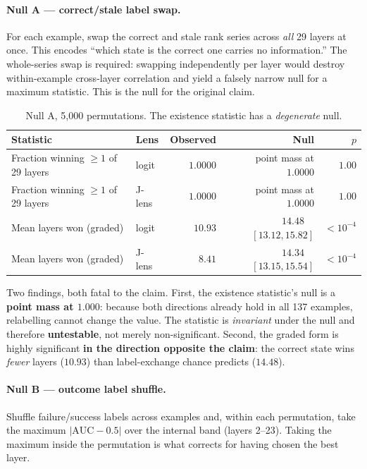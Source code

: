 \documentclass[11pt]{article}
\newcommand{\fail}[1]{\textcolor{bad}{\textbf{#1}}}
\begin{document}
\paragraph{Null A --- correct/stale label swap.} For each example, swap the correct and
stale rank series across \emph{all} 29 layers at once. This encodes ``which state is the
correct one carries no information.'' The whole-series swap is required: swapping
independently per layer would destroy within-example cross-layer correlation and yield a
falsely narrow null for a maximum statistic. This is the null for the original claim.

\begin{table}[h]
\centering\small
\begin{tabular}{llrrr}
\toprule
Statistic & Lens & Observed & Null & $p$ \\
\midrule
Fraction winning $\geq 1$ of 29 layers & logit & $1.0000$ & point mass at $1.0000$ & \fail{$1.00$} \\
Fraction winning $\geq 1$ of 29 layers & J-lens & $1.0000$ & point mass at $1.0000$ & \fail{$1.00$} \\
Mean layers won (graded)               & logit & $10.93$ & $14.48$\ \ $[13.12, 15.82]$ & \fail{$<10^{-4}$} \\
Mean layers won (graded)               & J-lens & $8.41$ & $14.34$\ \ $[13.15, 15.54]$ & \fail{$<10^{-4}$} \\
\bottomrule
\end{tabular}
\caption{Null A, 5{,}000 permutations. The existence statistic has a \emph{degenerate} null.}
\end{table}

Two findings, both fatal to the claim. First, the existence statistic's null is a
\textbf{point mass at $1.000$}: because both directions already hold in all 137 examples,
relabelling cannot change the value. The statistic is \emph{invariant} under the null and
therefore \textbf{untestable}, not merely non-significant. Second, the graded form is highly
significant \textbf{in the direction opposite the claim}: the correct state wins
\emph{fewer} layers ($10.93$) than label-exchange chance predicts ($14.48$).

\paragraph{Null B --- outcome label shuffle.} Shuffle failure/success labels across
examples and, within each permutation, take the maximum $|\mathrm{AUC}-0.5|$ over the
internal band (layers 2--23). Taking the maximum inside the permutation is what corrects for
having chosen the best layer.
\end{document}
